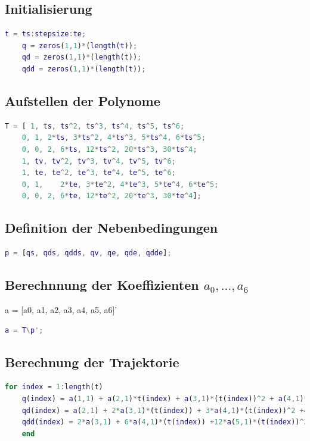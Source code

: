 \subsection{Initialisierung}
%
\begin{lstlisting}[language=Matlab, numbers=none]
	t = ts:stepsize:te;
	q = zeros(1,1)*(length(t));
	qd = zeros(1,1)*(length(t));
	qdd = zeros(1,1)*(length(t));
\end{lstlisting}
%
\subsection{Aufstellen der Polynome}
%
\begin{lstlisting}[language=Matlab, numbers=none]
	T = [ 1, ts, ts^2, ts^3, ts^4, ts^5, ts^6;
	0, 1, 2*ts, 3*ts^2, 4*ts^3, 5*ts^4, 6*ts^5;
	0, 0, 2, 6*ts, 12*ts^2, 20*ts^3, 30*ts^4;
	1, tv, tv^2, tv^3, tv^4, tv^5, tv^6;
	1, te, te^2, te^3, te^4, te^5, te^6;
	0, 1, 	 2*te, 3*te^2, 4*te^3, 5*te^4, 6*te^5;
	0, 0, 2, 6*te, 12*te^2, 20*te^3, 30*te^4];
\end{lstlisting}
%
\subsection{Definition der Nebenbedingungen}
%
\begin{lstlisting}[language=Matlab, numbers=none]
	p = [qs, qds, qdds, qv, qe, qde, qdde];
\end{lstlisting}
%
\subsection{Berechnnung der Koeffizienten $a_0,...,a_6$}
%
\begin{par}
	a = [a0, a1, a2, a3, a4, a5, a6]'
\end{par} \vspace{1em}
\begin{lstlisting}[language=Matlab, numbers=none]
	a = T\p';
\end{lstlisting}
%
\subsection{Berechnung der Trajektorie}
%
\begin{lstlisting}[language=Matlab, numbers=none]
	for index = 1:length(t)
	q(index) = a(1,1) + a(2,1)*t(index) + a(3,1)*(t(index))^2 + a(4,1)*(t(index))^3 +a(5,1)*(t(index))^4 + a(6,1)*(t(index))^5 + a(7,1)*(t(index))^6;
	qd(index) = a(2,1) + 2*a(3,1)*(t(index)) + 3*a(4,1)*(t(index))^2 +4*a(5,1)*(t(index))^3 + 5*a(6,1)*(t(index))^4 + 6*a(7,1)*(t(index))^5;
	qdd(index) = 2*a(3,1) + 6*a(4,1)*(t(index)) +12*a(5,1)*(t(index))^2 + 20*a(6,1)*(t(index))^3 + 30*a(7,1)*(t(index))^4;
	end
\end{lstlisting}
%
